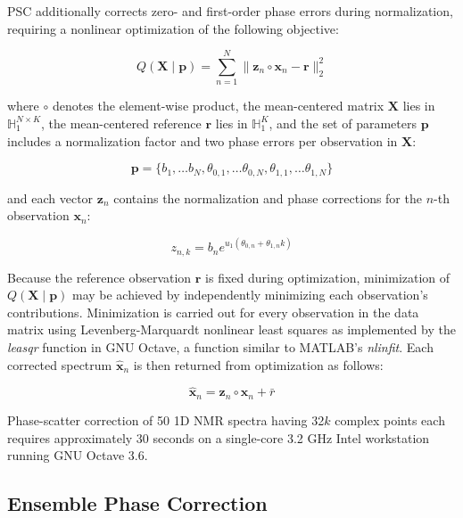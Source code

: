 \begin{doublespace}
PSC additionally corrects zero- and first-order phase errors during
normalization, requiring a nonlinear optimization of the following objective:

\begin{equation}
Q(\mathbf{X} \mid \mathbf{p})
 = \sum_{n=1}^N \| \mathbf{z}_n \circ \mathbf{x}_n - \mathbf{r} \|_2^2
\end{equation}

where $\circ$ denotes the element-wise product, the mean-centered matrix
$\mathbf{X}$ lies in $\mathbb{H}_1^{N \times K}$, the mean-centered reference
$\mathbf{r}$ lies in $\mathbb{H}_1^K$, and the set of parameters $\mathbf{p}$
includes a normalization factor and two phase errors per observation
in $\mathbf{X}$:

\begin{equation}
\mathbf{p} = \{
  b_1, \dots b_N,
  \theta_{0,1}, \dots \theta_{0,N},
  \theta_{1,1}, \dots \theta_{1,N} \}
\end{equation}

and each vector $\mathbf{z}_n$ contains the normalization and phase corrections
for the $n$-th observation $\mathbf{x}_n$:

\begin{equation}
z_{n,k} = b_n e^{u_1 (\theta_{0,n} + \theta_{1,n} k)}
\end{equation}

Because the reference observation $\mathbf{r}$ is fixed during optimization,
minimization of $Q(\mathbf{X} \mid \mathbf{p})$ may be achieved by
independently minimizing each observation's contributions. Minimization is
carried out for every observation in the data matrix using Levenberg-Marquardt
nonlinear least squares \cite{marquardt:jsiam1963} as implemented by the
{\it leasqr} function in GNU Octave, a function similar to MATLAB's
{\it nlinfit}. Each corrected spectrum $\hat{\mathbf{x}}_n$ is then returned
from optimization as follows:

\begin{equation}
\hat{\mathbf{x}}_n = \mathbf{z}_n \circ \mathbf{x}_n + \bar{r}
\end{equation}

Phase-scatter correction of 50 1D \hnmr{} NMR spectra having 32$k$ complex
points each requires approximately 30 seconds on a single-core 3.2 GHz Intel
workstation running GNU Octave 3.6.
\end{doublespace}

\subsection{Ensemble Phase Correction}


